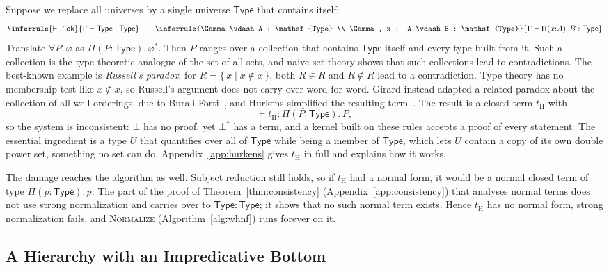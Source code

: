 \documentclass[acmsmall,screen,nonacm]{acmart}
\newcommand{\tPi}[3]{\Pi(#1{:}#2).\,#3}
\newcommand{\ctxok}[1]{\vdash #1\;\mathsf{ok}}
\begin{document}
Suppose we replace all universes by a single universe $\mathsf{Type}$ that contains itself:
\[
\inferrule{\ctxok{\Gamma}}{\Gamma \vdash \mathsf{Type} : \mathsf{Type}}
\qquad
\inferrule{\Gamma \vdash A : \mathsf{Type} \\ \Gamma, x : A \vdash B : \mathsf{Type}}{\Gamma \vdash \tPi{x}{A}{B} : \mathsf{Type}}
\]
Translate $\forall P.\,\varphi$ as $\tPi{P}{\mathsf{Type}}{\varphi^\ast}$.
Then $P$ ranges over a collection that contains $\mathsf{Type}$ itself and every type built from it.
Such a collection is the type-theoretic analogue of the set of all sets, and naive set theory shows that such collections lead to contradictions.
The best-known example is \emph{Russell's paradox}:
for $R = \{\, x \mid x \notin x \,\}$, both $R \in R$ and $R \notin R$ lead to a contradiction.
Type theory has no membership test like $x \notin x$, so Russell's argument does not carry over word for word.
Girard instead adapted a related paradox about the collection of all well-orderings, due to Burali-Forti~\cite{girard1972interpretation},
and Hurkens simplified the resulting term~\cite{hurkens1995simplification}.
The result is a closed term $t_{\mathrm{H}}$ with
\[
\vdash t_{\mathrm{H}} : \tPi{P}{\mathsf{Type}}{P},
\]
so the system is inconsistent: $\bot$ has no proof, yet $\bot^\ast$ has a term, and a kernel built on these rules accepts a proof of every statement.
The essential ingredient is a type $U$ that quantifies over all of $\mathsf{Type}$ while being a member of $\mathsf{Type}$,
which lets $U$ contain a copy of its own double power set, something no set can do.
Appendix~\ref{app:hurkens} gives $t_{\mathrm{H}}$ in full and explains how it works.


The damage reaches the algorithm as well.
Subject reduction still holds, so if $t_{\mathrm{H}}$ had a normal form, it would be a normal closed term of type $\tPi{p}{\mathsf{Type}}{p}$.
The part of the proof of Theorem~\ref{thm:consistency} (Appendix~\ref{app:consistency}) that analyses normal terms does not use strong normalization and carries over to $\mathsf{Type} : \mathsf{Type}$; it shows that no such normal term exists.
Hence $t_{\mathrm{H}}$ has no normal form, strong normalization fails, and \textsc{Normalize} (Algorithm~\ref{alg:whnf}) runs forever on it.

\subsection{A Hierarchy with an Impredicative Bottom}
\label{sec:hierarchy}
\end{document}
